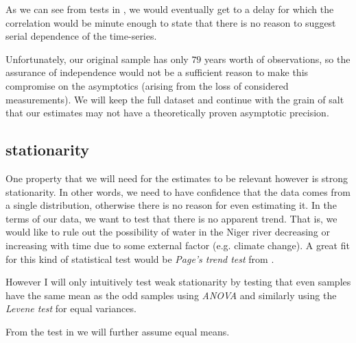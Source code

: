\begin{table}[H]
  \centering
  
  \caption{Ljung-Box autocorrelation test for increased delay between the samples}
  \label{tab:indep_test_wide}
\end{table}

As we can see from tests in , we would eventually get to a delay for which the 
correlation would be minute enough to state that there is no reason to suggest serial dependence of the time-series.


Unfortunately, our original sample has only \(79\) years worth of observations, so the assurance of independence would not 
be a sufficient reason to make this compromise on the asymptotics (arising from the loss of considered measurements). We will keep the full dataset and continue with the
grain of salt that our estimates may not have a theoretically proven asymptotic precision. 

\subsection{stationarity}%
\label{sub:stationarity}

One property that we will need for the estimates to be relevant however is strong stationarity. In other words, we need to
have confidence that the data comes from a single distribution, otherwise there is no reason for even estimating it. In
the terms of our data, we want to test that there is no apparent trend. That is, we would like to rule out the
possibility of water in the Niger river decreasing or increasing with time due to some external factor (e.g. climate
change). A great fit for this kind of statistical test would be \emph{Page's trend test} from \cite{pageContinuousInspectionSchemes1954}.

However I will only intuitively test weak stationarity by testing that even samples have the same mean as the odd 
samples using \emph{ANOVA} and similarly using the \emph{Levene test} for equal variances.

\begin{table}[H]
  \centering
  
  \caption{One way Analysis of Variance test for equality of means applied to even and odd samples of the time-series}
  \label{tab:mean_test}
\end{table}

From the test in  we will further assume equal means.


